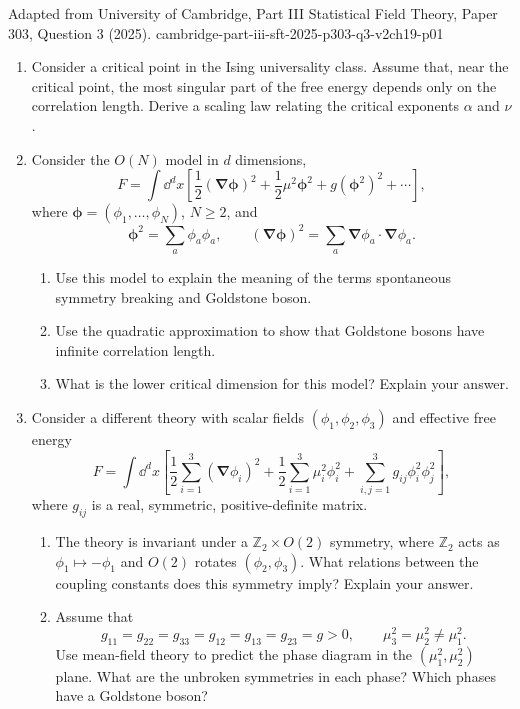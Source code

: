 
\begin{enumerate}
  {Adapted from University of Cambridge, Part III Statistical Field Theory,
  Paper 303, Question 3 (2025).}
  {cambridge-part-iii-sft-2025-p303-q3-v2ch19-p01}
  \begin{enumerate}
    \item[(a)]
    Consider a critical point in the Ising universality class. Assume that,
    near the critical point, the most singular part of the free energy
    depends only on the correlation length. Derive a scaling law relating the
    critical exponents \(\alpha\) and \(\nu\).
    \item[(b)]
    Consider the \(O(N)\) model in \(d\) dimensions,
    \[
      F=\int \dd^dx\left[
        \frac12(\boldsymbol\nabla\boldsymbol\phi)^2
        +\frac12\mu^2\boldsymbol\phi^2
        +g(\boldsymbol\phi^2)^2+\cdots\right],
    \]
    where \(\boldsymbol\phi=(\phi_1,\ldots,\phi_N)\), \(N\geq2\), and
    \[
      \boldsymbol\phi^2=\sum_a\phi_a\phi_a,
      \qquad
      (\boldsymbol\nabla\boldsymbol\phi)^2
        =\sum_a\boldsymbol\nabla\phi_a\cdot
          \boldsymbol\nabla\phi_a.
    \]
    \begin{enumerate}
      \item[(i)]
      Use this model to explain the meaning of the terms spontaneous symmetry
      breaking and Goldstone boson.
      \item[(ii)]
      Use the quadratic approximation to show that Goldstone bosons have
      infinite correlation length.
      \item[(iii)]
      What is the lower critical dimension for this model? Explain your
      answer.
    \end{enumerate}
    \item[(c)]
    Consider a different theory with scalar fields
    \((\phi_1,\phi_2,\phi_3)\) and effective free energy
    \[
      F=\int \dd^dx\left[
        \frac12\sum_{i=1}^3(\boldsymbol\nabla\phi_i)^2
        +\frac12\sum_{i=1}^3\mu_i^2\phi_i^2
        +\sum_{i,j=1}^3g_{ij}\phi_i^2\phi_j^2\right],
    \]
    where \(g_{ij}\) is a real, symmetric, positive-definite matrix.
    \begin{enumerate}
      \item[(i)]
      The theory is invariant under a \(\mathbb Z_2\times O(2)\) symmetry,
      where \(\mathbb Z_2\) acts as \(\phi_1\mapsto-\phi_1\) and \(O(2)\)
      rotates \((\phi_2,\phi_3)\). What relations between the coupling
      constants does this symmetry imply? Explain your answer.
      \item[(ii)]
      Assume that
      \[
        g_{11}=g_{22}=g_{33}=g_{12}=g_{13}=g_{23}=g>0,
        \qquad \mu_3^2=\mu_2^2\neq\mu_1^2.
      \]
      Use mean-field theory to predict the phase diagram in the
      \((\mu_1^2,\mu_2^2)\) plane. What are the unbroken symmetries in each
      phase? Which phases have a Goldstone boson?
    \end{enumerate}
  \end{enumerate}


\end{enumerate}
